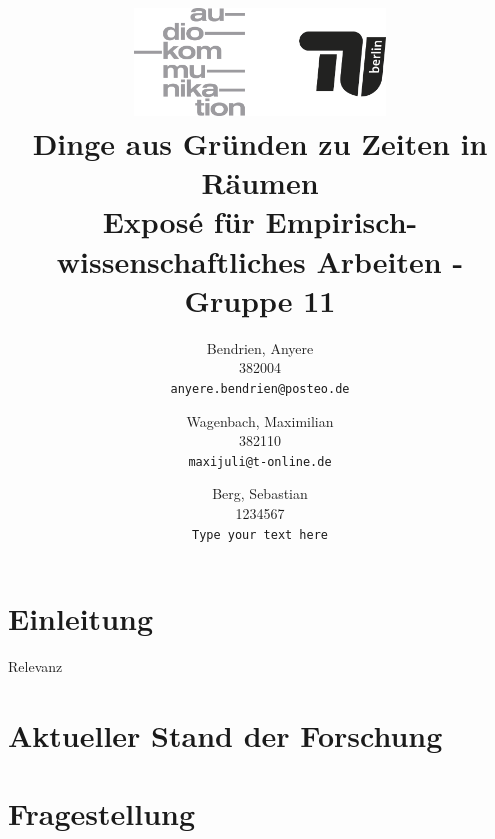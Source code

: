 





\title{
    \includegraphics[width=0.5\textwidth]{fig/audiokommtu-01.png}\\
    Dinge aus Gründen zu Zeiten in Räumen\\
    \small{Exposé für Empirisch-wissenschaftliches Arbeiten - Gruppe 11}
}
\author
{
Bendrien, Anyere \\
382004\\
\small\texttt{anyere.bendrien@posteo.de}
\and
Wagenbach, Maximilian \\
382110\\
\small\texttt{maxijuli@t-online.de}
\and
Berg, Sebastian \\
1234567\\
\small\texttt{Type your text here}
}

\maketitle

\thispagestyle{empty} \newpage \setcounter{page}{1}


\section{Einleitung}

Relevanz

\section{Aktueller Stand der Forschung}

\section{Fragestellung}
\cite{Urbano2013}




